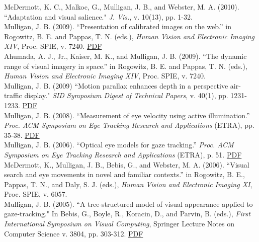 \documentclass[12pt]{article}
\newcommand{\years}[1]{\marginnote{\scriptsize #1}}
\begin{document}
McDermott, K. C., Malkoc, G., Mulligan, J. B., and Webster, M. A. (2010).
``Adaptation and visual salience."
\emph{J. Vis.}, v. 10(13), pp. 1-32.\\

\years{2009}
Mulligan, J. B. (2009).
``Presentation of calibrated images on the web.”
in Rogowitz, B. E. and Pappas, T. N. (eds.),
\emph{Human Vision and Electronic Imaging XIV},
Proc. SPIE, v. 7240.  \href{http://scanpath.arc.nasa.gov/pub_files/spie09.pdf}{PDF}\\

Ahumada, A. J., Jr., Kaiser, M. K., and Mulligan, J. B. (2009).
``The dynamic range of visual imagery in space.”
in Rogowitz, B. E. and Pappas, T. N. (eds.),
\emph{Human Vision and Electronic Imaging XIV},
Proc. SPIE, v. 7240.\\

Mulligan, J. B. (2009)
``Motion parallax enhances depth in a perspective air-traffic display."
\emph{SID Symposium Digest of Technical Papers}, v. 40(1), pp. 1231-1233.  \href{http://scanpath.arc.nasa.gov/pub_files/sid09.pdf}{PDF}\\

\years{2008}
Mulligan, J. B. (2008).
``Measurement of eye velocity using active illumination.”
\emph{Proc. ACM Symposium on Eye Tracking Research and Applications} (ETRA),
pp. 35-38.  \href{http://scanpath.arc.nasa.gov/pub_files/etra08.pdf}{PDF}\\

\years{2006}
Mulligan, J. B. (2006).
``Optical eye models for gaze tracking.”
\emph{Proc. ACM Symposium on Eye Tracking Research and Applications} (ETRA), p. 51.  \href{http://scanpath.arc.nasa.gov/pub_files/etra06.pdf}{PDF}\\

McDermott, K., Mulligan, J. B., Bebis, G., and Webster, M. A. (2006).
``Visual search and eye movements in novel and familiar contexts.”
in Rogowitz, B. E., Pappas, T. N., and Daly, S. J. (eds.),
\emph{Human Vision and Electronic Imaging XI},
Proc. SPIE, v. 6057.\\

\years{2005}
Mulligan, J. B. (2005).
``A tree-structured model of visual appearance applied to gaze-tracking."
In Bebis, G., Boyle, R., Koracin, D., and Parvin, B. (eds.),
\emph{First International Symposium on Visual Computing},
Springer Lecture Notes on Computer Science v. 3804, pp. 303-312.  \href{http://scanpath.arc.nasa.gov/pub_files/isvc05.pdf}{PDF}\\
\end{document}
